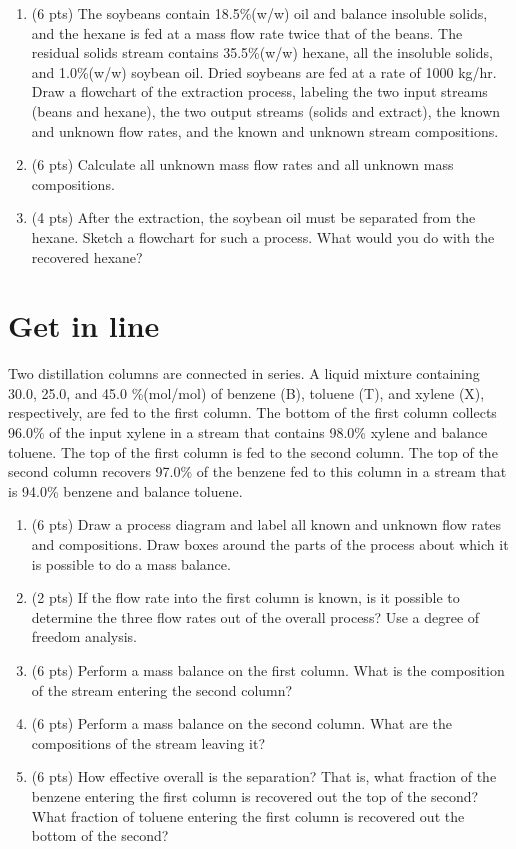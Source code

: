 \documentclass[11pt]{article}
\begin{document}
\begin{enumerate}
\item (6 pts) The soybeans contain 18.5\%(w/w) oil and balance insoluble solids, and the hexane is fed at a mass flow rate twice that of the beans.  The residual solids stream contains 35.5\%(w/w) hexane, all the insoluble solids, and 1.0\%(w/w) soybean oil.  Dried soybeans are fed at a rate of 1000 kg/hr.  Draw a flowchart of the extraction process, labeling the two input streams (beans and hexane), the two output streams (solids and extract), the known and unknown flow rates, and the known and unknown stream compositions.

\item (6 pts) Calculate all unknown mass flow rates and all unknown mass compositions.

\item (4 pts) After the extraction, the soybean oil must be separated from the hexane.  Sketch a flowchart for such a process.  What would you do with the recovered hexane?
\end{enumerate}

\section{Get in line}
\label{sec-5}
Two distillation columns are connected in series.  A liquid mixture containing 30.0, 25.0, and 45.0 \%(mol/mol) of benzene (B), toluene (T), and xylene (X), respectively, are fed to the first column.  The bottom of the first column collects 96.0\% of the input xylene in a stream that contains 98.0\% xylene and balance toluene.  The top of the first column is fed to the second column.  The top of the second column recovers 97.0\% of the benzene fed to this column in a stream that is 94.0\% benzene and balance toluene.

\begin{enumerate}
\item (6 pts) Draw a process diagram and label all known and unknown flow rates and compositions.  Draw boxes around the parts of the process about which it is possible to do a mass balance.

\item (2 pts) If the flow rate into the first column is known, is it possible to determine the three flow rates out of the overall process?  Use a degree of freedom analysis.

\item (6 pts) Perform a mass balance on the first column.  What is the composition of the stream entering the second column?

\item (6 pts) Perform a mass balance on the second column.  What are the compositions of the stream leaving it?

\item (6 pts) How effective overall is the separation?  That is, what fraction of the benzene entering the first column is recovered out the top of the second?  What fraction of toluene entering the first column is recovered out the bottom of the second?
\end{enumerate}
\end{document}
